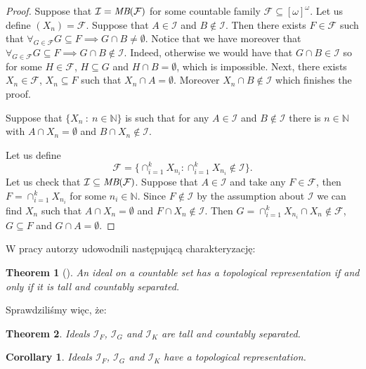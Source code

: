\documentclass{amsart}
\newtheorem{thm}{Theorem}
\newtheorem{cor}{Corollary}
\theoremstyle{definition}
\theoremstyle{definition}
\newcommand{\N}{{\mathbb N}}
\newcommand{\I}{\mathcal I}
\newcommand{\calF}{\mathcal{F}}
\begin{document}
\begin{proof}
Suppose that $\I = \emph{MB}(\calF)$ for some countable
family $\calF \subseteq [\omega]^\omega$.
Let us define $(X_n) = \calF$. Suppose that $A \in \I$
and $B \not\in \I$. Then there exists $F \in \calF$
such that $\forall_{G\in\calF} G \subseteq F \implies G \cap B \not= \emptyset$.
Notice that we have moreover that $\forall_{G\in\calF} G \subseteq F \implies G \cap B \not\in\I$.
Indeed, otherwise we would have that $G\cap B \in \I$ so
for some $H\in\calF$, $H\subseteq G$ and $H\cap B = \emptyset$,
which is impossible. 
Next, there exists $X_n \in \calF$, $X_n \subseteq F$ such 
that $X_n \cap A = \emptyset$. Moreover
$X_n \cap B\not \in \I$ which finishes the proof.

Suppose that
$\{X_n\ :\ n\in\N\}$ is such that for any $A\in \I$ and $B\notin \I$ 
there is $n\in\N$ with $A\cap X_n=\emptyset$ and $B\cap X_n\notin \I$. 

Let us define
\[
\calF = \{
  \cap_{i=1}^k X_{n_i}\colon \cap_{i=1}^k X_{n_i} \not\in \I
	\}.
\]	   
Let us check that $\I \subseteq \emph{MB}(\calF)$.
Suppose that $A\in\I$ and
take any $F\in\calF$, then 
$F = \cap_{i=1}^k X_{n_i}$ for some $n_i\in\N$.
Since $F\not\in\I$ by the assumption about $\I$
we can find $X_n$ such that $A\cap X_n=\emptyset$ and $F\cap X_n\not\in \I$. 
Then $G = \cap_{i=1}^k X_{n_i} \cap X_n\not\in\calF$,
$G\subseteq F$ and $G \cap A = \emptyset$.
\end{proof}

		\color{purple}


W pracy \cite{Adas} autorzy udowodnili następującą charakteryzację:
\begin{thm}[\cite{Adas}]
An ideal on a countable set has a topological representation if and only if it is tall and countably separated.
\end{thm}

Sprawdziliśmy więc, że:
\begin{thm}
Ideals $\I_F$, $\I_G$ and $\I_K$ are tall and countably separated.
\end{thm}

\begin{cor}
Ideals $\I_F$, $\I_G$ and $\I_K$ have a topological representation.
\end{cor}
\end{document}
